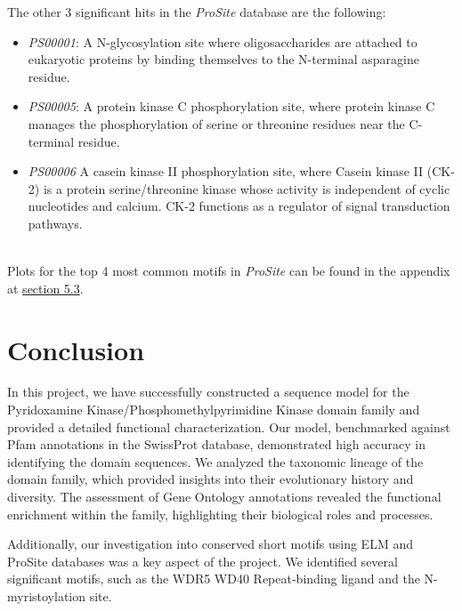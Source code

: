 \documentclass[10pt,twocolumn,letterpaper]{article}
\begin{document}
The other 3 significant hits in the \textit{ProSite} database are the following: 
\begin{itemize}
\item \textit{PS00001}: A N-glycosylation site where oligosaccharides are attached to eukaryotic proteins by binding themselves to the N-terminal asparagine residue.\cite{N-glycosylation}
\item \textit{PS00005}: A protein kinase C phosphorylation site, where protein kinase C manages the phosphorylation of serine or threonine residues near the C-terminal residue.\cite{kinase}
\item \textit{PS00006} A casein kinase II phosphorylation site, where Casein kinase II (CK-2) is a protein serine/threonine kinase whose activity is independent of cyclic nucleotides and calcium. CK-2 functions as a regulator of signal transduction pathways.\cite{kinase2}
\end{itemize} \\

Plots for the top 4 most common motifs in \textit{ProSite} can be found in the appendix at \hyperref[sec:prosite_motifs]{section 5.3}.

\section{Conclusion}

In this project, we have successfully constructed a sequence model for the Pyridoxamine Kinase/Phosphomethylpyrimidine Kinase domain family and provided a detailed functional characterization. Our model, benchmarked against Pfam annotations in the SwissProt database, demonstrated high accuracy in identifying the domain sequences. We analyzed the taxonomic lineage of the domain family, which provided insights into their evolutionary history and diversity. The assessment of Gene Ontology annotations revealed the functional enrichment within the family, highlighting their biological roles and processes.

Additionally, our investigation into conserved short motifs using ELM and ProSite databases was a key aspect of the project. We identified several significant motifs, such as the WDR5 WD40 Repeat-binding ligand and the N-myristoylation site.



{\small


}

\clearpage %
\onecolumn %
\end{document}
